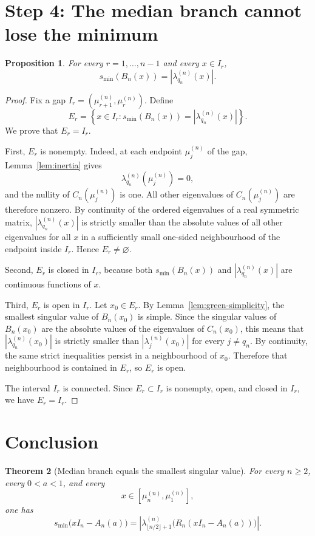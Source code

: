 \documentclass[11pt]{article}
\newtheorem{theorem}{Theorem}
\newtheorem{proposition}[theorem]{Proposition}
\begin{document}
\section*{Step 4: The median branch cannot lose the minimum}

\begin{proposition}\label{prop:median-gap}
For every $r=1,\ldots,n-1$ and every $x\in I_r$,
\[
s_{\min}(B_n(x))=
\left|\lambda_{q_n}^{(n)}(x)\right|.
\]
\end{proposition}

\begin{proof}
Fix a gap $I_r=(\mu_{r+1}^{(n)},\mu_r^{(n)})$.  Define
\[
E_r=
\left\{
 x\in I_r:
 s_{\min}(B_n(x))=
 \left|\lambda_{q_n}^{(n)}(x)\right|
\right\}.
\]
We prove that $E_r=I_r$.

First, $E_r$ is nonempty.  Indeed, at each endpoint $\mu_j^{(n)}$ of the gap,
Lemma~\ref{lem:inertia} gives
\[
\lambda_{q_n}^{(n)}(\mu_j^{(n)})=0,
\]
and the nullity of $C_n(\mu_j^{(n)})$ is one.  All other eigenvalues of
$C_n(\mu_j^{(n)})$ are therefore nonzero.  By continuity of the ordered
eigenvalues of a real symmetric matrix, $|\lambda_{q_n}^{(n)}(x)|$ is strictly
smaller than the absolute values of all other eigenvalues for all $x$ in a
sufficiently small one-sided neighbourhood of the endpoint inside $I_r$.  Hence
$E_r\neq\varnothing$.

Second, $E_r$ is closed in $I_r$, because both
$s_{\min}(B_n(x))$ and $|\lambda_{q_n}^{(n)}(x)|$ are continuous functions of
$x$.

Third, $E_r$ is open in $I_r$.  Let $x_0\in E_r$.  By
Lemma~\ref{lem:green-simplicity}, the smallest singular value of $B_n(x_0)$ is
simple.  Since the singular values of $B_n(x_0)$ are the absolute values of the
eigenvalues of $C_n(x_0)$, this means that
$|\lambda_{q_n}^{(n)}(x_0)|$ is strictly smaller than
$|\lambda_j^{(n)}(x_0)|$ for every $j\neq q_n$.  By continuity, the same strict
inequalities persist in a neighbourhood of $x_0$.  Therefore that
neighbourhood is contained in $E_r$, so $E_r$ is open.

The interval $I_r$ is connected.  Since $E_r\subset I_r$ is nonempty, open,
and closed in $I_r$, we have $E_r=I_r$.
\end{proof}

\section*{Conclusion}

\begin{theorem}[Median branch equals the smallest singular value]\label{thm:median}
For every $n\geq2$, every $0<a<1$, and every
\[
x\in[\mu_n^{(n)},\mu_1^{(n)}],
\]
one has
\[
\boxed{
 s_{\min}\bigl(xI_n-A_n(a)\bigr)
 =
 \left|
 \lambda_{\lfloor n/2\rfloor+1}^{(n)}
 \bigl(R_n(xI_n-A_n(a))\bigr)
 \right|.
}
\]
\end{theorem}
\end{document}

